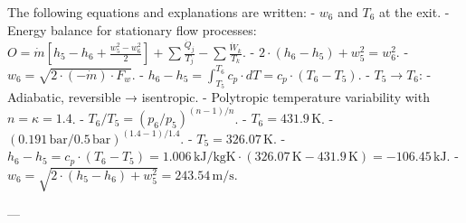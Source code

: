 The following equations and explanations are written:  
- \( w_6 \) and \( T_6 \) at the exit.  
- Energy balance for stationary flow processes:  
  \( O = \dot{m} \left[ h_5 - h_6 + \frac{w_5^2 - w_6^2}{2} \right] + \sum \frac{\dot{Q}_j}{T_j} - \sum \frac{\dot{W}_k}{T_k} \).  
- \( 2 \cdot (h_6 - h_5) + w_5^2 = w_6^2 \).  
- \( w_6 = \sqrt{2 \cdot (-\dot{m}) \cdot F_w} \).  
- \( h_6 - h_5 = \int_{T_5}^{T_6} c_p \cdot dT = c_p \cdot (T_6 - T_5) \).  
- \( T_5 \rightarrow T_6 \):  
  - Adiabatic, reversible → isentropic.  
  - Polytropic temperature variability with \( n = \kappa = 1.4 \).  
  - \( T_6 / T_5 = (p_6 / p_5)^{(n-1)/n} \).  
  - \( T_6 = 431.9 \, \text{K} \).  
  - \( (0.191 \, \text{bar} / 0.5 \, \text{bar})^{(1.4-1)/1.4} \).  
  - \( T_5 = 326.07 \, \text{K} \).  
- \( h_6 - h_5 = c_p \cdot (T_6 - T_5) = 1.006 \, \text{kJ/kgK} \cdot (326.07 \, \text{K} - 431.9 \, \text{K}) = -106.45 \, \text{kJ} \).  
- \( w_6 = \sqrt{2 \cdot (h_5 - h_6) + w_5^2} = 243.54 \, \text{m/s} \).

---